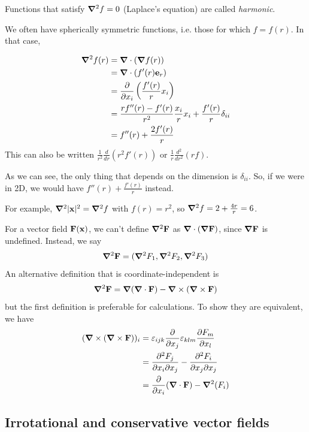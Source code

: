 \documentclass{../template/note}
\begin{document}
    Functions that satisfy \(\grad^2 f = 0\) (Laplace's equation) are called \emph{harmonic}.

    We often have spherically symmetric functions, i.e. those for which \(f = f(r)\). In that case,

    \begin{align*}
        \grad^2 f(r) &= \grad \cdot (\grad f(r)) \\
        &= \grad \cdot (f'(r) \V e_r) \\
        &= \pd{}{x_i} \left(\frac{f'(r)}{r} x_i\right) \\
        &= \frac{rf''(r) - f'(r)}{r^2} \frac{x_i}{r} x_i + \frac{f'(r)}{r} \delta_{ii} \\
        &= f''(r) + \frac{2f'(r)}{r}
    \end{align*}
    This can also be written \(\frac{1}{r^2} \frac{d}{dr} (r^2 f'(r))\) or \(\frac{1}{r} \frac{d^2}{dr^2}(rf)\).

    \begin{remark*}
        As we can see, the only thing that depends on the dimension is \(\delta_{ii}\). So, if we were in 2D, we would have \(f''(r) + \frac{f'(r)}{r}\) instead.
    \end{remark*}
    For example, \(\grad^2 |\V x|^2 = \grad^2f\) with \(f(r) = r^2\), so \(\grad^2 f = 2 + \frac{4r}{r} = 6\).

    For a vector field \(\V F(\V x)\), we can't define \(\grad^2 \V F\) as \(\grad \cdot (\grad \V F)\), since \(\grad \V F\) is undefined. Instead, we say
    \begin{align*}
        \grad^2 \V F = (\grad^2 F_1, \grad^2 F_2, \grad^2 F_3)
    \end{align*}
    An alternative definition that is coordinate-independent is
    \begin{align*}
        \grad^2 \V F = \grad(\grad \cdot \V F) - \grad \times (\grad \times \V F)
    \end{align*}
    but the first definition is preferable for calculations. To show they are equivalent, we have
    \begin{align*}
        (\curl(\curl \V F))_i &= \lv{ijk} \pd{}{x_j} \lv{klm} \pd{F_m}{x_l} \\
        &= \pd{^2F_j}{x_i \partial x_j} - \pd{^2F_i}{x_j \partial x_j} \\
        &= \pd{}{x_i} (\grad \cdot \V F) - \grad^2(F_i)
    \end{align*}
    
    \subsection{Irrotational and conservative vector fields}
\end{document}
